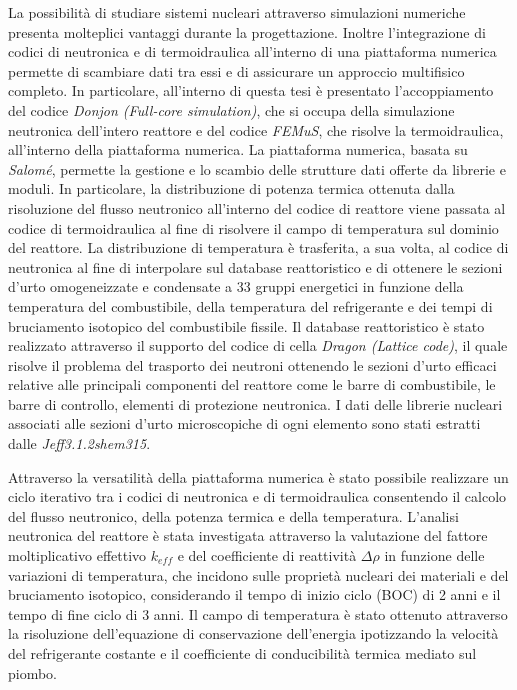 La possibilità di studiare sistemi nucleari attraverso simulazioni numeriche 
presenta molteplici vantaggi durante la progettazione. Inoltre  l'integrazione
di codici di neutronica e di termoidraulica all'interno di una 
piattaforma numerica permette di scambiare dati tra essi e di assicurare 
un approccio multifisico completo.
In particolare, all'interno di questa tesi è presentato l'accoppiamento del 
codice \textit{Donjon (Full-core simulation)}, che si occupa della simulazione 
neutronica dell'intero reattore e del codice \textit{FEMuS}, che risolve la
termoidraulica, all'interno della piattaforma numerica.
La piattaforma numerica, basata su \textit{Salom\'e}, permette la gestione e lo 
scambio delle strutture dati offerte da librerie e moduli. In particolare, 
la distribuzione di potenza termica ottenuta dalla risoluzione del flusso 
neutronico all'interno del codice di reattore viene passata al codice di 
termoidraulica al fine di risolvere il campo di temperatura sul dominio del 
reattore.
La distribuzione di temperatura è trasferita, a sua volta, al codice di 
neutronica al fine di interpolare sul database reattoristico e di ottenere le 
sezioni d'urto omogeneizzate e condensate a 33 gruppi energetici in funzione 
della temperatura del combustibile, della temperatura del refrigerante e dei tempi di 
bruciamento isotopico del combustibile fissile.
Il database reattoristico è stato realizzato attraverso il supporto del codice 
di cella \textit{Dragon (Lattice code)}, il quale risolve il problema del 
trasporto dei neutroni ottenendo le sezioni d'urto efficaci relative alle 
principali componenti del reattore come le barre di combustibile, le barre di 
controllo, elementi di protezione neutronica. I dati delle librerie nucleari 
associati alle sezioni d'urto microscopiche di ogni elemento sono stati estratti 
dalle \textit{Jeff3.1.2shem315}.

Attraverso la versatilità della piattaforma numerica è stato possibile realizzare 
un ciclo iterativo tra i codici di neutronica e di termoidraulica consentendo il calcolo del
flusso neutronico, della potenza termica e della temperatura.
L'analisi neutronica del reattore è stata investigata attraverso la valutazione 
del fattore moltiplicativo effettivo $k_{eff}$ e del coefficiente di reattività 
$\Delta \rho$ in funzione delle variazioni di temperatura, che incidono sulle 
proprietà nucleari dei materiali e del bruciamento isotopico, considerando il
tempo di inizio ciclo (BOC) di 2 anni e il tempo di fine ciclo di 3 anni.
Il campo di temperatura è stato ottenuto attraverso la risoluzione 
dell'equazione di conservazione dell'energia ipotizzando la velocità del 
refrigerante costante e il coefficiente di conducibilità termica mediato sul 
piombo.

